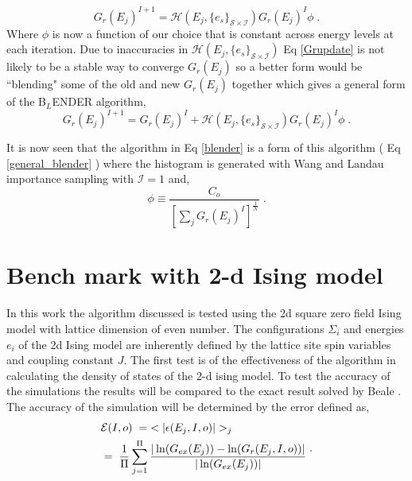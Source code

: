 \documentclass[aps,prl,reprint,superscriptaddress,showkeys]{revtex4-1}
\begin{document}
 \begin{equation}
 G_r(E_j)^{I+1} = \mathcal{H}(E_j,\{e_s\}_{\mathcal{S}\times\mathcal{I}}) G_r(E_j)^I  \phi \;.
 \label{Grupdate}
 \end{equation}
Where $\phi$ is now a function of our choice that is constant across energy levels at each iteration. Due to inaccuracies in $\mathcal{H}(E_j,\{e_s\}_{\mathcal{S}\times\mathcal{I}})$ Eq \ref{Grupdate} is not likely to be a stable way to converge $G_r(E_j)$ so a better form would be ``blending"  some of the old and new $G_r(E_j)$ together which gives a general form of the B$_L$ENDER algorithm, 
\begin{equation}
G_r(E_j)^{I+1} = G_r(E_j)^I   +    \mathcal{H}(E_j,\{e_s\}_{\mathcal{S}\times\mathcal{I}}) G_r(E_j)^I  \phi \;.
\label{general_blender}
\end{equation}

It is now seen that the algorithm in Eq \ref{blender} is a form of this algorithm ( Eq \ref{general_blender} ) where the histogram is generated with Wang and Landau importance sampling with $\mathcal{I} = 1 $ and,
\begin{equation}
\phi \equiv  \frac{C_o  }{ [\sum_j G_{r}(E_j)^{I}]^{\frac{1}{N} } } \;.
\end{equation}


\section{Bench mark with 2-d Ising model}
In this work the algorithm discussed is tested using the 2d square zero field  Ising model with lattice dimension of even number\cite{exact_statistical,Onsager,Ising}.  The configurations $\Sigma_i$ and energies $e_i$ of the 2d Ising model are inherently defined by the lattice site spin variables and coupling constant $J$.   The first test is of the effectiveness of the algorithm in calculating the density of states of the 2-d ising model.  To test the accuracy of the simulations the results will be compared to the exact result solved by Beale \cite{Beale_2d_ising}. The accuracy of the simulation will be determined by the error defined as, 
\begin{equation}
\begin{split}
 &\mathcal{E}(I,o) \hspace{0.1cm}= \hspace{0.1cm}< |\epsilon(E_j,I,o)| >_j\\
& = \hspace{0.1cm}  \frac{1}{\Pi} \sum_{j=1}^{\Pi}\frac{|\ln(G_{ex}(E_j))- \ln(G_{r}(E_j,I,o))|}{|\ln(G_{ex}(E_j))|}\; 
 \end{split}. 
 \label{avg_error}
\end{equation}
\end{document}
